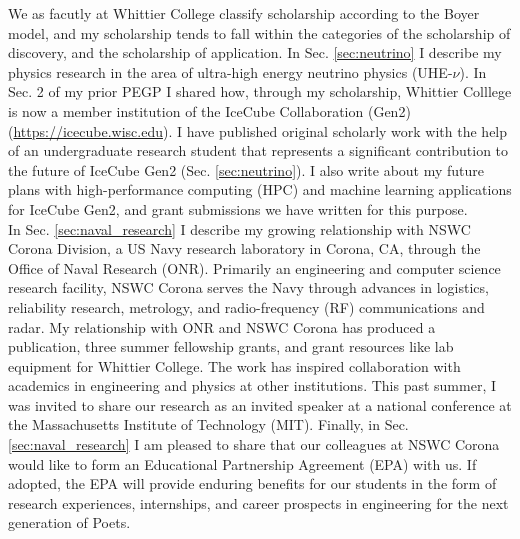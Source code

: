 \documentclass[../../main.tex]{subfiles}
\begin{document}
\label{sec:scholarship}

We as facutly at Whittier College classify scholarship according to the Boyer model, and my scholarship tends to fall within the categories of the scholarship of discovery, and the scholarship of application.  In Sec. \ref{sec:neutrino} I describe my physics research in the area of ultra-high energy neutrino physics (UHE-$\nu$).  In Sec. 2 of my prior PEGP I shared how, through my scholarship, Whittier Colllege is now a member institution of the IceCube Collaboration (Gen2) (\url{https://icecube.wisc.edu}).  I have published original scholarly work with the help of an undergraduate research student that represents a significant contribution to the future of IceCube Gen2 (Sec. \ref{sec:neutrino}).  I also write about my future plans with high-performance computing (HPC) and machine learning applications for IceCube Gen2, and grant submissions we have written for this purpose.
\\
\vspace{0.25cm}
In Sec. \ref{sec:naval_research} I describe my growing relationship with NSWC Corona Division, a US Navy research laboratory in Corona, CA, through the Office of Naval Research (ONR).  Primarily an engineering and computer science research facility, NSWC Corona serves the Navy through advances in logistics, reliability research, metrology, and radio-frequency (RF) communications and radar.  My relationship with ONR and NSWC Corona has produced a publication, three summer fellowship grants, and grant resources like lab equipment for Whittier College.  The work has inspired collaboration with academics in engineering and physics at other institutions.  This past summer, I was invited to share our research as an invited speaker at a national conference at the Massachusetts Institute of Technology (MIT).  Finally, in Sec. \ref{sec:naval_research} I am pleased to share that our colleagues at NSWC Corona would like to form an Educational Partnership Agreement (EPA) with us.  If adopted, the EPA will provide enduring benefits for our students in the form of research experiences, internships, and career prospects in engineering for the next generation of Poets.

\begin{flushleft}

\end{flushleft}

\begin{flushleft}

\end{flushleft}
\end{document}
